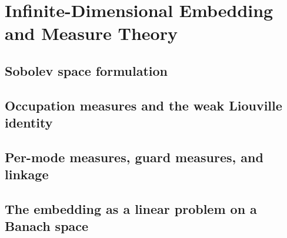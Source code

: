 
\section{Infinite-Dimensional Embedding and Measure Theory}
\label{sec:embedding}

\subsection{Sobolev space formulation}
\label{sub:sobolev_space_formulation}

\subsection{Occupation measures and the weak Liouville identity}
\label{sub:occupation_measures_and_liouville}

\subsection{Per-mode measures, guard measures, and linkage}
\label{sub:per_mode_measures_and_linkage}

\subsection{The embedding as a linear problem on a Banach space}
\label{sub:linear_problem_on_banach_space}
